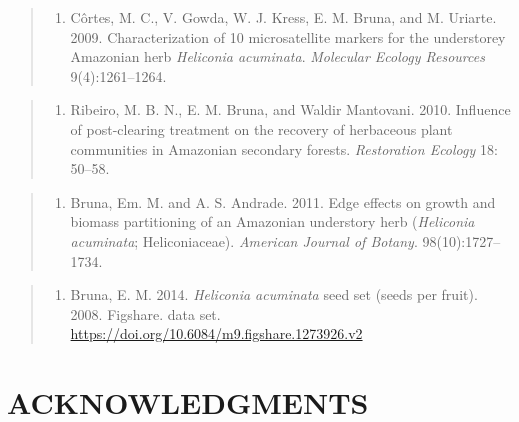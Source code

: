 \documentclass[
  12pt,
  man, donotrepeattitle,floatsintext]{apa6}
\providecommand{\tightlist}{%
  \setlength{\itemsep}{0pt}\setlength{\parskip}{0pt}}
\begin{document}
\begin{quote}
\begin{enumerate}
\def\labelenumi{\arabic{enumi}.}
\setcounter{enumi}{4}
\tightlist
\item
  Côrtes, M. C., V. Gowda, W. J. Kress, E. M. Bruna, and M. Uriarte. 2009. Characterization of 10 microsatellite markers for the understorey Amazonian herb \emph{Heliconia acuminata}. \emph{Molecular Ecology Resources} 9(4):1261--1264.
\end{enumerate}
\end{quote}

\begin{quote}
\begin{enumerate}
\def\labelenumi{\arabic{enumi}.}
\setcounter{enumi}{5}
\tightlist
\item
  Ribeiro, M. B. N., E. M. Bruna, and Waldir Mantovani. 2010. Influence of post-clearing treatment on the recovery of herbaceous plant communities in Amazonian secondary forests. \emph{Restoration Ecology} 18: 50--58.
\end{enumerate}
\end{quote}

\begin{quote}
\begin{enumerate}
\def\labelenumi{\arabic{enumi}.}
\setcounter{enumi}{6}
\tightlist
\item
  Bruna, Em. M. and A. S. Andrade. 2011. Edge effects on growth and biomass partitioning of an Amazonian understory herb (\emph{Heliconia acuminata}; Heliconiaceae). \emph{American Journal of Botany}. 98(10):1727--1734.
\end{enumerate}
\end{quote}

\begin{quote}
\begin{enumerate}
\def\labelenumi{\arabic{enumi}.}
\setcounter{enumi}{7}
\tightlist
\item
  Bruna, E. M. 2014. \emph{Heliconia acuminata} seed set (seeds per fruit). 2008. Figshare. data set. \url{https://doi.org/10.6084/m9.figshare.1273926.v2}
\end{enumerate}
\end{quote}

\hypertarget{acknowledgments}{%
\section{ACKNOWLEDGMENTS}\label{acknowledgments}}
\end{document}

